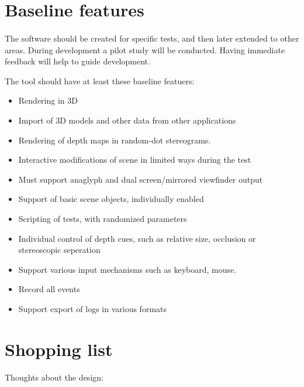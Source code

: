 \documentclass[11pt]{scrartcl}
\begin{document}
\begin{multicols}{2}
\section{Baseline features}
\paragraph{}
The software should be created for specific tests, and then later extended to other areas. During development a pilot study will be conducted. Having immediate feedback will help to guide development.

The tool should have at least these baseline featuers:

\begin{itemize}
\item Rendering in 3D
\item Import of 3D models and other data from other applications
\item Rendering of depth maps in random-dot stereograms.
\item Interactive modifications of scene in limited ways during the test
\item Must support anaglyph and dual screen/mirrored viewfinder output
\item Support of basic scene objects, individually enabled
\item Scripting of tests, with randomized parameters
\item Individual control of depth cues, such as relative size, occlusion or stereoscopic seperation
\item Support various input mechanisms such as keyboard, mouse.
\item Record all events
\item Support export of logs in various formats
\end{itemize}

\section{Shopping list}
\paragraph{}
Thoughts about the design:


\end{multicols}
\end{document}
